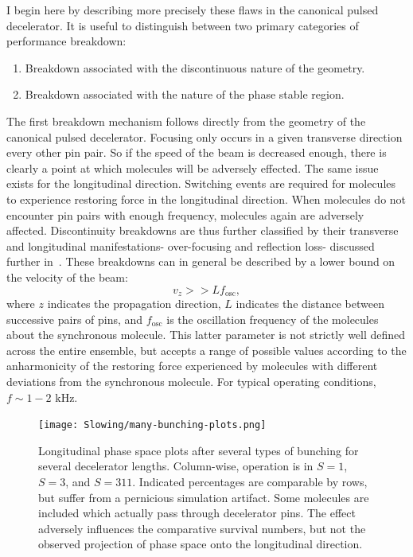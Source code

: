 I begin here by describing more precisely these flaws in the canonical pulsed decelerator.
It is useful to distinguish between two primary categories of performance breakdown:
\begin{enumerate}
\item Breakdown associated with the discontinuous nature of the geometry.
\item Breakdown associated with the nature of the phase stable region.
\end{enumerate}
The first breakdown mechanism follows directly from the geometry of the canonical pulsed decelerator. Focusing only occurs in a given transverse direction every other pin pair. So if the speed of the beam is decreased enough, there is clearly a point at which molecules will be adversely effected.
The same issue exists for the longitudinal direction. Switching events are required for molecules to experience restoring force in the longitudinal direction. When molecules do not encounter pin pairs with enough frequency, molecules again are adversely affected.
Discontinuity breakdowns are thus further classified by their transverse and longitudinal manifestations- over-focusing and reflection loss- discussed further in~\cite{Sawyer2008a}.
These breakdowns can in general be described by a lower bound on the velocity of the beam:
\begin{equation}
v_z >> Lf_\text{osc} \label{breakdownequation},
\end{equation}
where $z$ indicates the propagation direction, $L$ indicates the distance between successive pairs of pins, and $f_\text{osc}$ is the oscillation frequency of the molecules about the synchronous molecule.
This latter parameter is not strictly well defined across the entire ensemble, but accepts a range of possible values according to the anharmonicity of the restoring force experienced by molecules with different deviations from the synchronous molecule.
For typical operating conditions, $f\sim 1-2\text{ kHz}$.

\begin{figure}[t!]
\centering
\texttt{[image: Slowing/many-bunching-plots.png]}%
\caption[Phase Space for S=1, S=3, and S=311]{\label{fig:bunchingphasespace311}
Longitudinal phase space plots after several types of bunching for several decelerator lengths. Column-wise, operation is in $S=1$, $S=3$, and $S=311$. Indicated percentages are comparable by rows, but suffer from a pernicious simulation artifact. Some molecules are included which actually pass through decelerator pins. The effect adversely influences the comparative survival numbers, but not the observed projection of phase space onto the longitudinal direction.
}
\end{figure}

